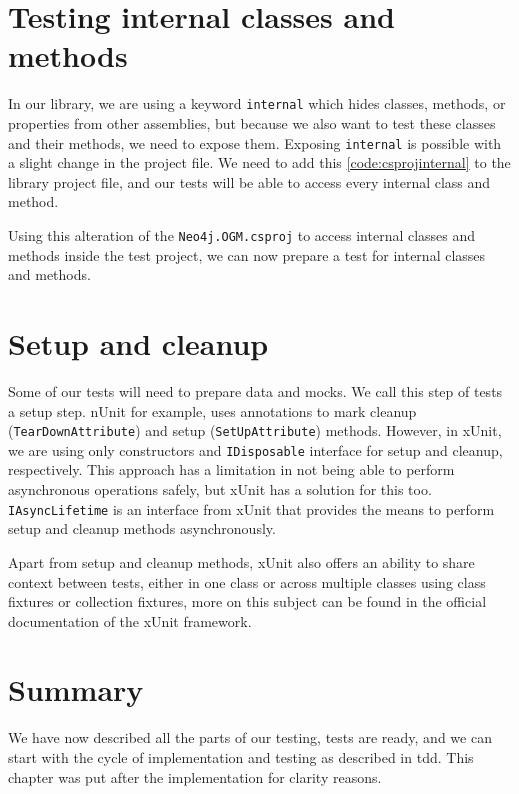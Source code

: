 \section{Testing internal classes and methods}

In our library, we are using a keyword \texttt{internal} which hides classes, methods, or properties from other assemblies,
but because we also want to test these classes and their methods, we need to expose them. Exposing \texttt{internal} is possible
with a slight change in the project file. We need to add this \ref{code:csprojinternal} to the library project file, and our tests will be able to access every internal
class and method.


Using this alteration of the \texttt{Neo4j.OGM.csproj} to access internal classes and methods inside the test project,
we can now prepare a test for internal classes and methods.

\section {Setup and cleanup}

Some of our tests will need to prepare data and mocks. We call this step of tests a setup step. nUnit for example, uses annotations
to mark cleanup (\texttt{TearDownAttribute}) and setup (\texttt{SetUpAttribute}) methods. However, in xUnit, we are using only constructors and \texttt{IDisposable}
interface for setup and cleanup, respectively. This approach has a limitation in not being able to perform asynchronous operations safely,
but xUnit has a solution for this too. \texttt{IAsyncLifetime} is an interface from xUnit that provides the means to perform setup and cleanup
methods asynchronously.

Apart from setup and cleanup methods, xUnit also offers an ability to share context between tests, either in one class or across multiple classes
using class fixtures or collection fixtures, more on this subject can be found in the official documentation of the xUnit framework.

\section {Summary}

We have now described all the parts of our testing, tests are ready, and we can start with the cycle of implementation and testing
as described in \acrshort{tdd}. This chapter was put after the implementation for clarity reasons.